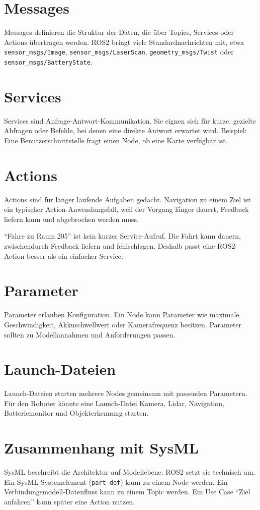 \section{Messages}
Messages definieren die Struktur der Daten, die über Topics, Services oder Actions übertragen werden. ROS2 bringt viele Standardnachrichten mit, etwa \texttt{sensor\_msgs/Image}, \texttt{sensor\_msgs/LaserScan}, \texttt{geometry\_msgs/Twist} oder \texttt{sensor\_msgs/BatteryState}.

\section{Services}
Services sind Anfrage-Antwort-Kommunikation. Sie eignen sich für kurze, gezielte Abfragen oder Befehle, bei denen eine direkte Antwort erwartet wird. Beispiel: Eine Benutzerschnittstelle fragt einen Node, ob eine Karte verfügbar ist.

\section{Actions}
Actions sind für länger laufende Aufgaben gedacht. Navigation zu einem Ziel ist ein typischer Action-Anwendungsfall, weil der Vorgang länger dauert, Feedback liefern kann und abgebrochen werden muss.

\begin{praxisbox}
\enquote{Fahre zu Raum 205} ist kein kurzer Service-Aufruf. Die Fahrt kann dauern, zwischendurch Feedback liefern und fehlschlagen. Deshalb passt eine ROS2-Action besser als ein einfacher Service.
\end{praxisbox}

\section{Parameter}
Parameter erlauben Konfiguration. Ein Node kann Parameter wie maximale Geschwindigkeit, Akkuschwellwert oder Kamerafrequenz besitzen. Parameter sollten zu Modellannahmen und Anforderungen passen.

\section{Launch-Dateien}
Launch-Dateien starten mehrere Nodes gemeinsam mit passenden Parametern. Für den Roboter könnte eine Launch-Datei Kamera, Lidar, Navigation, Batteriemonitor und Objekterkennung starten.

\section{Zusammenhang mit SysML}
SysML beschreibt die Architektur auf Modellebene. ROS2 setzt sie technisch um. Ein SysML-Systemelement (\texttt{part def}) kann zu einem Node werden. Ein Verbindungsmodell-Datenfluss kann zu einem Topic werden. Ein Use Case \enquote{Ziel anfahren} kann später eine Action nutzen.

